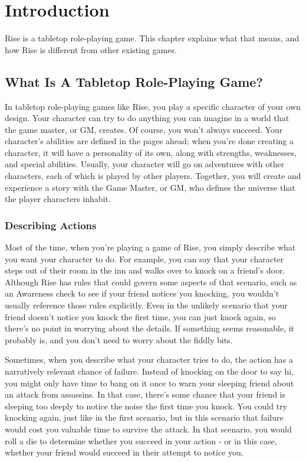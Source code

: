 \chapter{Introduction}

Rise is a tabletop role-playing game.
This chapter explains what that means, and how Rise is different from other existing games.

\section{What Is A Tabletop Role-Playing Game?}
    In tabletop role-playing games like Rise, you play a specific character of your own design.
    Your character can try to do anything you can imagine in a world that the game master, or GM, creates.
    Of course, you won't always succeed.
    Your character's abilities are defined in the pages ahead; when you're done creating a character, it will have a personality of its own, along with strengths, weaknesses, and special abilities.
    Usually, your character will go on adventures with other characters, each of which is played by other players.
    Together, you will create and experience a story with the Game Master, or GM, who defines the universe that the player characters inhabit.

    \subsection{Describing Actions}
        Most of the time, when you're playing a game of Rise, you simply describe what you want your character to do.
        For example, you can say that your character steps out of their room in the inn and walks over to knock on a friend's door.
        Although Rise has rules that could govern some aspects of that scenario, such as an Awareness check to see if your friend notices you knocking, you wouldn't usually reference those rules explicitly.
        Even in the unlikely scenario that your friend doesn't notice you knock the first time, you can just knock again, so there's no point in worrying about the details.
        If something seems reasonable, it probably is, and you don't need to worry about the fiddly bits.

        Sometimes, when you describe what your character tries to do, the action has a narratively relevant chance of failure.
        Instead of knocking on the door to say hi, you might only have time to bang on it once to warn your sleeping friend about an attack from assassins.
        In that case, there's some chance that your friend is sleeping too deeply to notice the noise the first time you knock.
        You could try knocking again, just like in the first scenario, but in this scenario that failure would cost you valuable time to survive the attack.
        In that scenario, you would roll a die to determine whether you succeed in your action - or in this case, whether your friend would succeed in their attempt to notice you.

